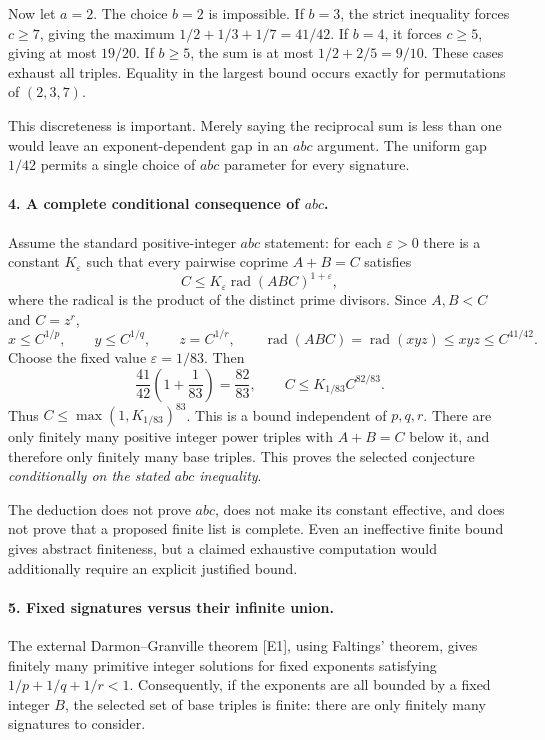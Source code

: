 \documentclass[11pt]{article}
\begin{document}
Now let $a=2$. The choice $b=2$ is impossible. If $b=3$, the strict inequality forces $c\ge7$, giving the maximum $1/2+1/3+1/7=41/42$. If $b=4$, it forces $c\ge5$, giving at most $19/20$. If $b\ge5$, the sum is at most $1/2+2/5=9/10$. These cases exhaust all triples. Equality in the largest bound occurs exactly for permutations of $(2,3,7)$.

This discreteness is important. Merely saying the reciprocal sum is less than one would leave an exponent-dependent gap in an $abc$ argument. The uniform gap $1/42$ permits a single choice of $abc$ parameter for every signature.

\paragraph{4. A complete conditional consequence of $abc$.}
Assume the standard positive-integer $abc$ statement: for each $\varepsilon>0$ there is a constant $K_\varepsilon$ such that every pairwise coprime $A+B=C$ satisfies
\[
 C\le K_\varepsilon\operatorname{rad}(ABC)^{1+\varepsilon},
\]
where the radical is the product of the distinct prime divisors. Since $A,B<C$ and $C=z^r$,
\[
 x\le C^{1/p},\qquad y\le C^{1/q},\qquad z=C^{1/r},
 \qquad
 \operatorname{rad}(ABC)=\operatorname{rad}(xyz)\le xyz
 \le C^{41/42}.
\]
Choose the fixed value $\varepsilon=1/83$. Then
\[
 \frac{41}{42}\left(1+\frac1{83}\right)=\frac{82}{83},
 \qquad C\le K_{1/83}C^{82/83}.
\]
Thus $C\le\max(1,K_{1/83})^{83}$. This is a bound independent of $p,q,r$. There are only finitely many positive integer power triples with $A+B=C$ below it, and therefore only finitely many base triples. This proves the selected conjecture \emph{conditionally on the stated $abc$ inequality}.

The deduction does not prove $abc$, does not make its constant effective, and does not prove that a proposed finite list is complete. Even an ineffective finite bound gives abstract finiteness, but a claimed exhaustive computation would additionally require an explicit justified bound.

\paragraph{5. Fixed signatures versus their infinite union.}
The external Darmon--Granville theorem [E1], using Faltings' theorem, gives finitely many primitive integer solutions for fixed exponents satisfying $1/p+1/q+1/r<1$. Consequently, if the exponents are all bounded by a fixed integer $B$, the selected set of base triples is finite: there are only finitely many signatures to consider.
\end{document}
